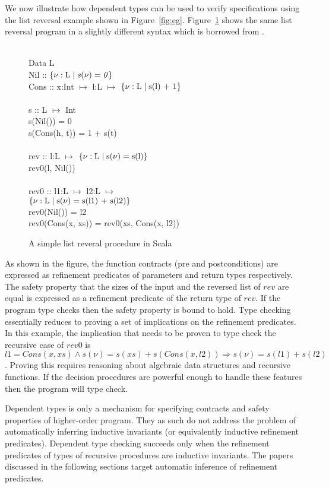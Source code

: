 We now illustrate how dependent types can be used to verify specifications using 
the list reversal example shown in Figure~\ref{fig:eg}.
Figure~\ref{fig:deptypes-eg} shows the same list reversal program 
in a slightly different syntax which is borrowed from \cite{rjhala:ESOP13}.
%
\begin{figure}
\begin{myprogram}
\\
\pnl Data L \\
\pnl \>   Nil :: $\mathit{\{ \nu:\text{L} \; | \; s(\nu) = 0\}}$  \\
\pnl \>   Cons :: x:Int $\mapsto$ l:L $\mapsto$ 
				$\mathit{\{ \nu:\text{L} \; | \; \text{s(l) + 1}\}}$ \\
\\
\pnl s :: L $\mapsto$ Int \\
\pnl \>    s(Nil()) = 0 \\
\pnl \>    s(Cons(h, t)) = 1 + s(t) \\
\\
\pnl rev :: l:L $\mapsto$ $\mathit{\{ \nu:\text{L} \; | \; \text{s}(\nu) = \text{s(l)}\}}$ \\
\pnl \> rev0(l, Nil())  \\
\\    
\pnl rev0 :: l1:L $\mapsto$ l2:L $\mapsto$  \\
\> \> \> \> \> $\mathit{\{ \nu:\text{L} \; | \; \text{s}(\nu) = \text{s(l1) + s(l2)}\}}$  \\
\pnl \> rev0(Nil()) = l2 \\
\pnl \> rev0(Cons(x, xs)) = rev0(xs, Cons(x, l2))
\end{myprogram}
\caption{A simple list reveral procedure in Scala} \label{fig:deptypes-eg}
\end{figure}
%
As shown in the figure, the function contracts (pre and postconditions) are expressed as refinement predicates of parameters and return types respectively. 
The safety property that the sizes of the input and the reversed list of $rev$ are equal is expressed as a refinement predicate of the return type of $rev$. If the 
program type checks then the safety property is bound to hold.
Type checking essentially reduces to proving a set of implications on the refinement predicates. In this example, the implication that needs to be proven to type check the recursive case of $rev0$ is $l1 = Cons(x,xs) \wedge s(\nu) = s(xs) + s(Cons(x,l2)) \Rightarrow s(\nu) = s(l1) + s(l2)$.
Proving this requires reasoning about algebraic data structures and recursive functions. If the decision procedures are powerful enough to handle these features then the program will type check.

Dependent types is only a mechanism for specifying contracts and safety properties of higher-order program. They as such do not address the problem of automatically inferring inductive invariants (or equivalently inductive refinement predicates). Dependent type checking succeeds only when the refinement predicates of types of recursive procedures are inductive invariants. The papers discussed in the following sections target automatic inference of refinement predicates.